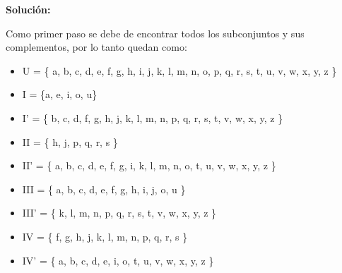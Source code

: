 \documentclass{article}%
\begin{document}
\vspace{0.4in}

\textbf{Solución:} 
\vspace{0.3in}

Como primer paso se debe de encontrar todos los subconjuntos y sus complementos, por lo tanto quedan como:


\begin{itemize}
    \item U = \{ a, b, c, d, e, f, g, h, i, j, k, l, m, n, o, p, q, r, s, t, u, v, w, x, y, z \} 
\end{itemize}


\begin{itemize}

    \item I = \{a, e, i, o, u\}
    \item I' = \{ b, c, d, f, g, h, j, k, l, m, n, p, q, r, s, t, v, w, x, y, z \} 

    \item II = \{ h, j, p, q, r, s  \}
    \item II' = \{ a, b, c, d, e, f, g, i, k, l, m, n, o, t, u, v, w, x, y, z \} 

    \item III = \{ a, b, c, d, e, f, g, h, i, j, o, u  \}       
    \item III' = \{ k, l, m, n, p, q, r, s, t, v, w, x, y, z \}

    \item IV = \{ f, g, h, j, k, l, m, n, p, q, r, s  \}
    \item IV' = \{ a, b, c, d, e, i, o, t, u, v, w, x, y, z \} 

\end{itemize}













\newpage






\newpage
\end{document}
